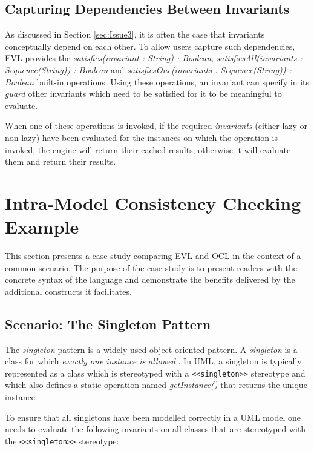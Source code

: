 \subsection{Capturing Dependencies Between Invariants}

As discussed in Section \ref{sec:Issue3}, it is often the case that invariants conceptually depend on each other. To allow users capture such dependencies, EVL provides the \emph{satisfies(invariant : String) : Boolean}, \emph{satisfiesAll(invariants : Sequence(String)) : Boolean} and \emph{satisfiesOne(invariants : Sequence(String)) : Boolean} built-in operations. Using these operations, an invariant can specify in its \emph{guard} other invariants which need to be satisfied for it to be meaningful to evaluate.

When one of these operations is invoked, if the required \emph{invariants} (either lazy or non-lazy) have been evaluated for the instances on which the operation is invoked, the engine will return their cached results; otherwise it will evaluate them and return their results.

\section{Intra-Model Consistency Checking Example}
\label{sec:EvlIntraModelExample}
This section presents a case study comparing EVL and OCL in the context of a common scenario. The purpose of the case study is to present readers with the concrete syntax of the language and demonstrate the benefits delivered by the additional constructs it facilitates.

\subsection{Scenario: The Singleton Pattern}

The \emph{singleton} pattern is a widely used object oriented pattern. A \emph{singleton} is a class for which \emph{exactly one instance is allowed} \cite{Larman}. In UML, a singleton is typically represented as a class which is stereotyped with a \verb|<<singleton>>| stereotype and which also defines a static operation named \emph{getInstance()} that returns the unique instance. 

To ensure that all singletons have been modelled correctly in a UML model one needs to evaluate the following invariants on all classes that are stereotyped with the \verb|<<singleton>>| stereotype:

